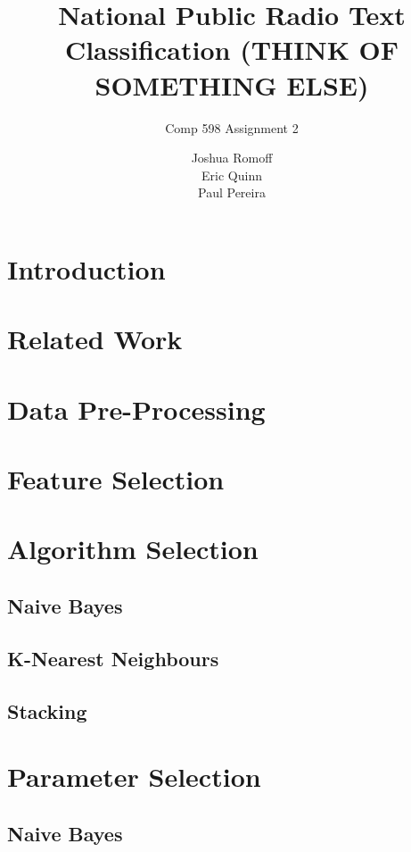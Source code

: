 \documentclass{acm_proc_article-sp}
\begin{document}
\title{National Public Radio Text Classification (THINK OF SOMETHING ELSE)}
\subtitle{Comp 598 Assignment 2}


\author{
\alignauthor
Joshua Romoff\\
\alignauthor
Eric Quinn\\
\alignauthor
Paul Pereira\\
}
\maketitle
\section{Introduction}

\section{Related Work}

\section{Data Pre-Processing}

\section{Feature Selection}

\section{Algorithm Selection}
\subsection{Naive Bayes}

\subsection{K-Nearest Neighbours}

\subsection{Stacking}

\section{Parameter Selection}
\subsection{Naive Bayes}
\end{document}
